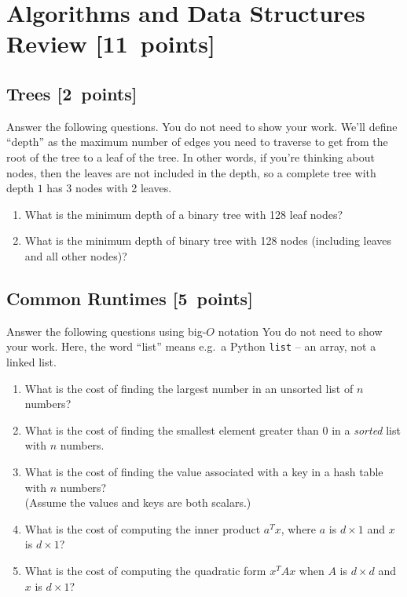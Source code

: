 \documentclass{article}
\newcommand{\blu}[1]{{\textcolor{blu}{#1}}}
\let\ask\blu
\newcommand\pts[1]{\textcolor{pointscolour}{[#1~points]}}
\begin{document}
  \clearpage\section{Algorithms and Data Structures Review \pts{11}}

  \subsection{Trees \pts{2}}

  \ask{Answer the following questions.} You do not need to show your work. We'll define ``depth'' as the maximum number of edges you need to traverse to get from the root of the tree to a leaf of the tree. In other words, if you're thinking about nodes, then the leaves are not included in the depth, so a complete tree with depth $1$ has 3 nodes with 2 leaves.


  \begin{enumerate}
  \item What is the minimum depth of a binary tree with 128 leaf nodes?
  \item What is the minimum depth of binary tree with 128 nodes (including leaves and all other nodes)?
  \end{enumerate}

  \subsection{Common Runtimes \pts{5}}

  \ask{Answer the following questions using big-$O$ notation} You do not need to show your work.
  Here, the word ``list'' means e.g.\ a Python \texttt{list} -- an array, not a linked list.
  \begin{enumerate}
  \item What is the cost of finding the largest number in an unsorted list of $n$ numbers?
  \item What is the cost of finding the smallest element greater than 0 in a \emph{sorted} list with $n$ numbers.
  \item What is the cost of finding the value associated with a key in a hash table with $n$ numbers? \\(Assume the values and keys are both scalars.)
  \item What is the cost of computing the inner product $a^Tx$, where $a$ is $d \times 1$ and $x$ is $d \times 1$?
  \item What is the cost of computing the quadratic form $x^TAx$ when $A$ is $d \times d$ and $x$ is $d \times 1$?
  \end{enumerate}
\end{document}
